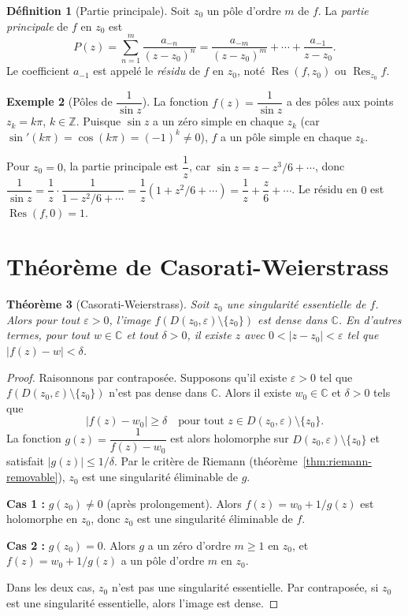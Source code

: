 \documentclass[12pt,a4paper,openany]{book}
\theoremstyle{definition}
\newtheorem{definition}{Définition}[chapter]
\newtheorem{exemple}[definition]{Exemple}
\theoremstyle{plain}
\newtheorem{theoreme}[definition]{Théorème}
\theoremstyle{remark}
\newcommand{\C}{\mathbb{C}}
\newcommand{\Z}{\mathbb{Z}}
\DeclareMathOperator{\Res}{Res}
\newcommand{\abs}[1]{\left|#1\right|}
\begin{document}
\begin{definition}[Partie principale]\label{def:principal-part}
Soit $z_0$ un pôle d'ordre $m$ de $f$. La \emph{partie principale}
de $f$ en $z_0$ est
\[
  P(z) = \sum_{n=1}^{m}\frac{a_{-n}}{(z - z_0)^n}
  = \frac{a_{-m}}{(z-z_0)^m} + \cdots + \frac{a_{-1}}{z-z_0}.
\]
Le coefficient $a_{-1}$ est appelé le \emph{résidu} de $f$ en $z_0$,
noté $\Res(f, z_0)$ ou $\Res_{z_0} f$.
\end{definition}

\begin{exemple}[Pôles de $\dfrac{1}{\sin z}$]\label{ex:poles-1/sinz}
La fonction $f(z) = \dfrac{1}{\sin z}$ a des pôles aux points
$z_k = k\pi$, $k \in \Z$. Puisque $\sin z$ a un zéro simple en
chaque $z_k$ (car $\sin'(k\pi) = \cos(k\pi) = (-1)^k \neq 0$),
$f$ a un pôle simple en chaque $z_k$.

Pour $z_0 = 0$, la partie principale est $\dfrac{1}{z}$, car
$\sin z = z - z^3/6 + \cdots$, donc
$\dfrac{1}{\sin z} = \dfrac{1}{z}\cdot\dfrac{1}{1 - z^2/6 + \cdots}
= \dfrac{1}{z}(1 + z^2/6 + \cdots) = \dfrac{1}{z} + \dfrac{z}{6} + \cdots$.
Le résidu en $0$ est $\Res(f, 0) = 1$.
\end{exemple}

\section{Théorème de Casorati-Weierstrass}

\begin{theoreme}[Casorati-Weierstrass]\label{thm:casorati-weierstrass}
Soit $z_0$ une singularité essentielle de $f$. Alors pour tout
$\varepsilon > 0$, l'image $f(D(z_0,\varepsilon)\setminus\{z_0\})$
est dense dans $\C$. En d'autres termes, pour tout $w \in \C$ et
tout $\delta > 0$, il existe $z$ avec $0 < \abs{z - z_0} < \varepsilon$
tel que $\abs{f(z) - w} < \delta$.
\end{theoreme}

\begin{proof}
Raisonnons par contraposée. Supposons qu'il existe $\varepsilon > 0$
tel que $f(D(z_0,\varepsilon)\setminus\{z_0\})$ n'est pas dense dans
$\C$. Alors il existe $w_0 \in \C$ et $\delta > 0$ tels que
\[
  \abs{f(z) - w_0} \geq \delta \quad \text{pour tout }
  z \in D(z_0,\varepsilon)\setminus\{z_0\}.
\]
La fonction $g(z) = \dfrac{1}{f(z) - w_0}$ est alors holomorphe sur
$D(z_0,\varepsilon)\setminus\{z_0\}$ et satisfait $\abs{g(z)} \leq 1/\delta$.
Par le critère de Riemann (théorème~\ref{thm:riemann-removable}), $z_0$
est une singularité éliminable de $g$.

\medskip
\noindent\textbf{Cas 1 :} $g(z_0) \neq 0$ (après prolongement). Alors
$f(z) = w_0 + 1/g(z)$ est holomorphe en $z_0$, donc $z_0$ est une
singularité éliminable de $f$.

\medskip
\noindent\textbf{Cas 2 :} $g(z_0) = 0$. Alors $g$ a un zéro d'ordre
$m \geq 1$ en $z_0$, et $f(z) = w_0 + 1/g(z)$ a un pôle d'ordre $m$
en $z_0$.

\medskip
Dans les deux cas, $z_0$ n'est pas une singularité essentielle. Par
contraposée, si $z_0$ est une singularité essentielle, alors l'image
est dense.
\end{proof}
\end{document}

